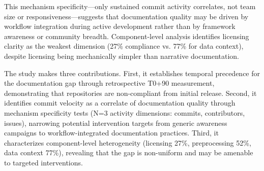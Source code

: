 This mechanism specificity---only sustained commit activity correlates, not team size or responsiveness---suggests that documentation quality may be driven by workflow integration during active development rather than by framework awareness or community breadth. Component-level analysis identifies licensing clarity as the weakest dimension (27\% compliance vs. 77\% for data context), despite licensing being mechanically simpler than narrative documentation.

The study makes three contributions. First, it establishes temporal precedence for the documentation gap through retrospective T0+90 measurement, demonstrating that repositories are non-compliant from initial release. Second, it identifies commit velocity as a correlate of documentation quality through mechanism specificity tests (N=3 activity dimensions: commits, contributors, issues), narrowing potential intervention targets from generic awareness campaigns to workflow-integrated documentation practices. Third, it characterizes component-level heterogeneity (licensing 27\%, preprocessing 52\%, data context 77\%), revealing that the gap is non-uniform and may be amenable to targeted interventions.
